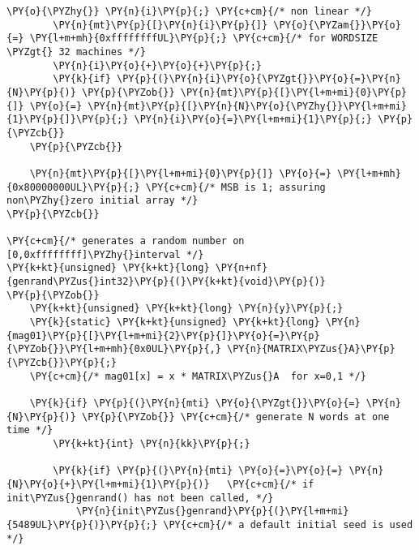 \begin{Verbatim}[commandchars=\\\{\}]
          \PY{o}{\PYZhy{}} \PY{n}{i}\PY{p}{;} \PY{c+cm}{/* non linear */}
        \PY{n}{mt}\PY{p}{[}\PY{n}{i}\PY{p}{]} \PY{o}{\PYZam{}}\PY{o}{=} \PY{l+m+mh}{0xffffffffUL}\PY{p}{;} \PY{c+cm}{/* for WORDSIZE \PYZgt{} 32 machines */}
        \PY{n}{i}\PY{o}{+}\PY{o}{+}\PY{p}{;}
        \PY{k}{if} \PY{p}{(}\PY{n}{i}\PY{o}{\PYZgt{}}\PY{o}{=}\PY{n}{N}\PY{p}{)} \PY{p}{\PYZob{}} \PY{n}{mt}\PY{p}{[}\PY{l+m+mi}{0}\PY{p}{]} \PY{o}{=} \PY{n}{mt}\PY{p}{[}\PY{n}{N}\PY{o}{\PYZhy{}}\PY{l+m+mi}{1}\PY{p}{]}\PY{p}{;} \PY{n}{i}\PY{o}{=}\PY{l+m+mi}{1}\PY{p}{;} \PY{p}{\PYZcb{}}
    \PY{p}{\PYZcb{}}

    \PY{n}{mt}\PY{p}{[}\PY{l+m+mi}{0}\PY{p}{]} \PY{o}{=} \PY{l+m+mh}{0x80000000UL}\PY{p}{;} \PY{c+cm}{/* MSB is 1; assuring non\PYZhy{}zero initial array */} 
\PY{p}{\PYZcb{}}

\PY{c+cm}{/* generates a random number on [0,0xffffffff]\PYZhy{}interval */}
\PY{k+kt}{unsigned} \PY{k+kt}{long} \PY{n+nf}{genrand\PYZus{}int32}\PY{p}{(}\PY{k+kt}{void}\PY{p}{)}
\PY{p}{\PYZob{}}
    \PY{k+kt}{unsigned} \PY{k+kt}{long} \PY{n}{y}\PY{p}{;}
    \PY{k}{static} \PY{k+kt}{unsigned} \PY{k+kt}{long} \PY{n}{mag01}\PY{p}{[}\PY{l+m+mi}{2}\PY{p}{]}\PY{o}{=}\PY{p}{\PYZob{}}\PY{l+m+mh}{0x0UL}\PY{p}{,} \PY{n}{MATRIX\PYZus{}A}\PY{p}{\PYZcb{}}\PY{p}{;}
    \PY{c+cm}{/* mag01[x] = x * MATRIX\PYZus{}A  for x=0,1 */}

    \PY{k}{if} \PY{p}{(}\PY{n}{mti} \PY{o}{\PYZgt{}}\PY{o}{=} \PY{n}{N}\PY{p}{)} \PY{p}{\PYZob{}} \PY{c+cm}{/* generate N words at one time */}
        \PY{k+kt}{int} \PY{n}{kk}\PY{p}{;}

        \PY{k}{if} \PY{p}{(}\PY{n}{mti} \PY{o}{=}\PY{o}{=} \PY{n}{N}\PY{o}{+}\PY{l+m+mi}{1}\PY{p}{)}   \PY{c+cm}{/* if init\PYZus{}genrand() has not been called, */}
            \PY{n}{init\PYZus{}genrand}\PY{p}{(}\PY{l+m+mi}{5489UL}\PY{p}{)}\PY{p}{;} \PY{c+cm}{/* a default initial seed is used */}


\end{Verbatim}
